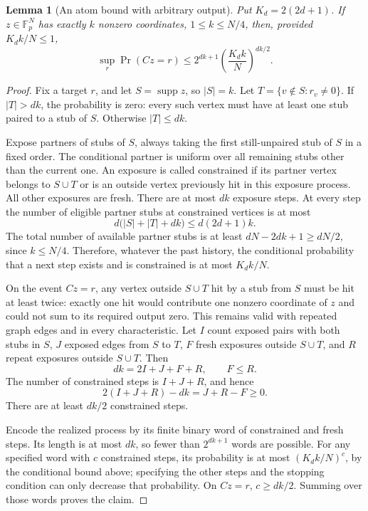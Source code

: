\documentclass[11pt]{article}
\newtheorem{lemma}{Lemma}
\newcommand{\Fp}{\mathbb F_p}
\begin{document}
\begin{lemma}[An atom bound with arbitrary output]\label{lem:atom}
Put $K_d=2(2d+1)$. If $z\in\Fp^N$ has exactly $k$ nonzero coordinates,
$1\le k\le N/4$, then, provided $K_dk/N\le1$,
\[
 \sup_r\Pr(Cz=r)
 \le2^{dk+1}\left(\frac{K_dk}{N}\right)^{dk/2}.
\]
\end{lemma}
\begin{proof}
Fix a target $r$, and let $S=\operatorname{supp}z$, so $|S|=k$.
Let $T=\{v\notin S:r_v\ne0\}$. If $|T|>dk$, the probability is zero:
every such vertex must have at least one stub paired to a stub of $S$.
Otherwise $|T|\le dk$.

Expose partners of stubs of $S$, always taking the first still-unpaired
stub of $S$ in a fixed order. The conditional partner is uniform over
all remaining stubs other than the current one. An exposure is called
constrained if its partner vertex belongs to $S\cup T$ or is an outside
vertex previously hit in this exposure process. All other exposures
are fresh. There are at most $dk$ exposure steps. At every step the
number of eligible partner stubs at constrained vertices is at most
\[
 d\bigl(|S|+|T|+dk\bigr)\le d(2d+1)k.
\]
The total number of available partner stubs is at least
$dN-2dk+1\ge dN/2$, since $k\le N/4$. Therefore, whatever the past
history, the conditional probability that a next step exists and is
constrained is at most $K_dk/N$.

On the event $Cz=r$, any vertex outside $S\cup T$ hit by a stub from
$S$ must be hit at least twice: exactly one hit would contribute one
nonzero coordinate of $z$ and could not sum to its required output zero.
This remains valid with repeated graph edges and in every characteristic.
Let $I$ count exposed pairs with both stubs in $S$, $J$ exposed edges
from $S$ to $T$, $F$ fresh exposures outside $S\cup T$, and $R$ repeat
exposures outside $S\cup T$. Then
\[
 dk=2I+J+F+R,\qquad F\le R.
\]
The number of constrained steps is $I+J+R$, and hence
\[
 2(I+J+R)-dk=J+R-F\ge0.
\]
There are at least $dk/2$ constrained steps.

Encode the realized process by its finite binary word of constrained
and fresh steps. Its length is at most $dk$, so fewer than
$2^{dk+1}$ words are possible. For any specified word with $c$
constrained steps, its probability is at most $(K_dk/N)^c$, by the
conditional bound above; specifying the other steps and the stopping
condition can only decrease that probability. On $Cz=r$, $c\ge dk/2$.
Summing over those words proves the claim.
\end{proof}
\end{document}
